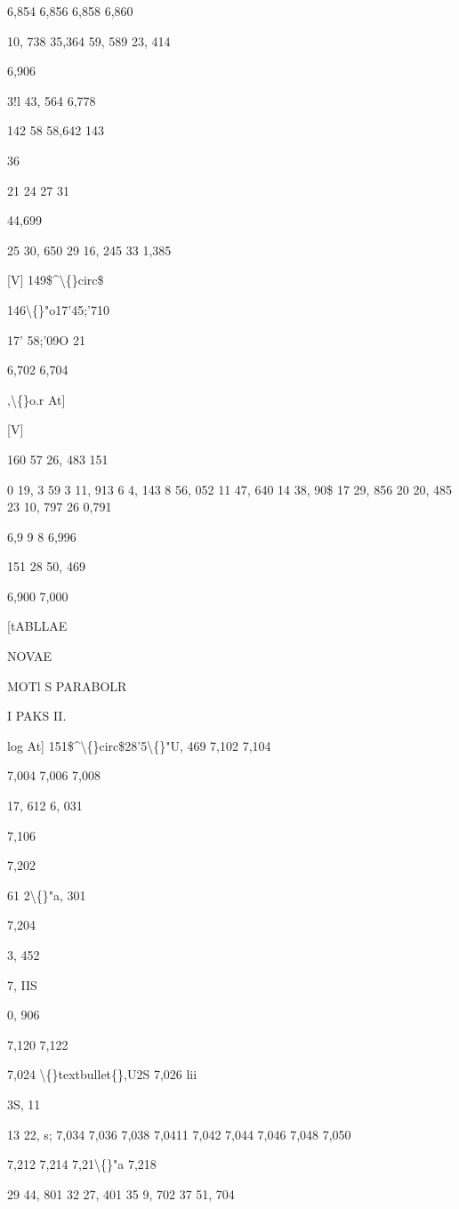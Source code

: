 \documentclass[10pt,a4paper]{article}
\begin{document}
6,854
6,856
6,858
6,860

10, 738
35,364
59, 589
23, 414

6,906

3!l 43, 564
6,778

142 58 58,642
143

36

21
24
27
31

44,699

25 30, 650
29 16, 245
33
1,385

[V]
149\$\textasciicircum{}\textbackslash\{\}circ\$

146\textbackslash\{\}"o17'45;'710

17' 58;'09O
21

6,702
6,704

,\textbackslash\{\}o.r At]

[V]

160 57 26, 483
151

0 19, 3 59
3 11, 913
6 4, 143
8 56, 052
11 47, 640
14 38, 90\$
17 29, 856
20 20, 485
23 10, 797
26 0,791

6,9 9 8
6,996

151 28 50, 469

6,900
7,000

\newpage

[tABLLAE

NOVAE

MOTl S PARABOLR

I PAKS II.

log At]
151\$\textasciicircum{}\textbackslash\{\}circ\$28'5\textbackslash\{\}"U, 469
7,102
7,104

7,004
7,006
7,008

17, 612
6, 031

7,106

7,202

61 2\textbackslash\{\}"a, 301

7,204

3, 452

7, IIS

0, 906

7,120
7,122

7,024
\textbackslash\{\}textbullet\{\},U2S
7,026
lii

3S, 11

13 22, s;
7,034
7,036
7,038
7,0411
7,042
7,044
7,046
7,048
7,050

7,212
7,214
7,21\textbackslash\{\}"a
7,218

29 44, 801
32 27, 401
35 9, 702
37 51, 704
\end{document}

